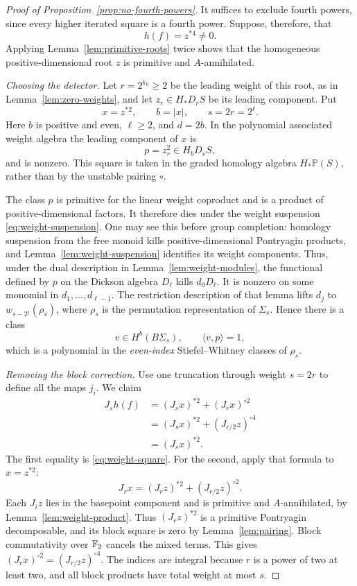 \begin{proof}[Proof of Proposition~\ref{prop:no-fourth-powers}]
It suffices to exclude fourth powers, since every higher iterated square
is a fourth power. Suppose, therefore, that
\[
 h(f)=z^{*4}\ne0.
\]
Applying Lemma~\ref{lem:primitive-roots} twice shows that the
homogeneous positive-dimensional root \(z\) is primitive and
\(A\)-annihilated.

\emph{Choosing the detector.}
Let \(r=2^{k_0}\ge2\) be the leading weight of this root, as in
Lemma~\ref{lem:zero-weights}, and let \(z_r\in H_*D_rS\) be its
leading component. Put
\[
 x=z^{*2},\qquad b=|x|,\qquad s=2r=2^\ell.
\]
Here \(b\) is positive and even, \(\ell\ge2\), and \(d=2b\).
In the polynomial associated weight algebra the leading component of
\(x\) is
\[
 p=z_r^2\in H_bD_sS,
\]
and is nonzero. This square is taken in the graded homology algebra
\(H_*\mathbb P(S)\), rather than by the unstable pairing \(\circ\).

The class $p$ is primitive for the linear weight coproduct and is a
product of positive-dimensional factors.  It therefore dies under
the weight suspension \eqref{eq:weight-suspension}.
One may see this before group completion: homology suspension from
the free monoid kills positive-dimensional Pontryagin products, and
Lemma~\ref{lem:weight-suspension} identifies its weight components.
Thus, under the dual description in
Lemma~\ref{lem:weight-modules}, the functional defined by $p$ on the
Dickson algebra $D_\ell$ kills $d_0D_\ell$.
It is nonzero on some monomial in $d_1,\ldots,d_{\ell-1}$.
The restriction description of that lemma lifts $d_j$ to
$w_{s-2^j}(\rho_s)$, where $\rho_s$ is the permutation representation
of $\Sigma_s$.  Hence there is a class
\begin{equation}
\label{eq:even-characteristic-detector}
 v\in H^b(B\Sigma_s),\qquad \langle v,p\rangle=1,
\end{equation}
which is a polynomial in the \emph{even-index}
Stiefel--Whitney classes of $\rho_s$.

\emph{Removing the block correction.}
Use one truncation through weight \(s=2r\) to define all the maps
\(j_i\). We claim
\begin{equation}
\label{eq:power-projection}
 \begin{split}
 J_s h(f)
  &=(J_sx)^{*2}+(J_rx)^{\circ2}\\
  &=(J_sx)^{*2}+(J_{r/2}z)^{\circ4}\\
  &=(J_sx)^{*2}.
 \end{split}
\end{equation}
The first equality is \eqref{eq:weight-square}. For the second,
apply that formula to \(x=z^{*2}\):
\[
 J_rx=(J_rz)^{*2}+(J_{r/2}z)^{\circ2}.
\]
Each \(J_i z\) lies in the basepoint component and is primitive and
\(A\)-annihilated, by Lemma~\ref{lem:weight-product}. Thus
\((J_rz)^{*2}\) is a primitive Pontryagin decomposable, and its
block square is zero by Lemma~\ref{lem:pairing}. Block commutativity
over \(\mathbb F_2\) cancels the mixed terms. This gives
\((J_rx)^{\circ2}=(J_{r/2}z)^{\circ4}\).
The indices are integral because \(r\) is a power of two at least two,
and all block products have total weight at most \(s\).


\end{proof}
